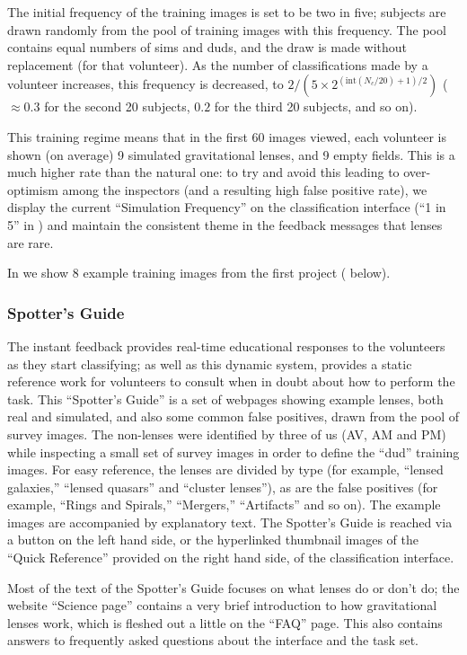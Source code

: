 \documentclass[useAMS,usenatbib,a4paper]{mn2e}
\begin{document}
The initial frequency of the training images is set to be two in five;
subjects are drawn randomly from the pool of training images with this
frequency. The pool contains equal numbers of sims and duds, and the draw is
made without replacement (for that volunteer). As the number of
classifications made by a volunteer increases, this frequency is decreased, to
$2/(5\times2^{(\textrm{int}(N_c/20)+1)/2})$ ($\approx 0.3$ for the second 20
subjects, $0.2$ for the third 20 subjects, and so on).

This training regime means that in the first 60 images viewed, each volunteer
is shown (on average) 9 simulated gravitational lenses, and 9 empty fields. 
This is a much higher rate than the natural one: to try and avoid this leading
to over-optimism among the inspectors (and a resulting high false positive
rate), we display the current ``Simulation Frequency'' on the classification
interface (``1 in 5'' in ) and maintain the consistent
theme in the feedback messages that lenses are rare.

In  we show 8 example training images from the
first \sw project ( below). 


\subsubsection{Spotter's Guide}

The instant feedback provides real-time educational responses to the
volunteers as they start classifying; as well as this dynamic system, \sw
provides a static reference work for volunteers to consult when in doubt about
how to perform the task. This ``Spotter's Guide'' is a set of webpages showing
example lenses, both real and simulated, and also some common false positives,
drawn from the pool of survey images. The non-lenses were identified by three
of us (AV, AM and PM) while inspecting a small set of survey images in order
to define the ``dud'' training images. For easy reference, the lenses are
divided by type (for example, ``lensed galaxies,'' ``lensed quasars'' and
``cluster lenses''), as are the false positives (for example, ``Rings and
Spirals,'' ``Mergers,'' ``Artifacts'' and so on). The example images are
accompanied by explanatory text. The Spotter's Guide is reached via a button
on the left hand side, or the hyperlinked thumbnail images of the ``Quick
Reference'' provided on the right hand side, of the classification interface.

Most of the text of the Spotter's Guide focuses on what lenses do or don't do;
the website ``Science page'' contains a very brief introduction to how
gravitational lenses work, which is fleshed out a little on the ``FAQ'' page. 
This also contains answers to frequently asked questions about the interface
and the task set. 
\end{document}
